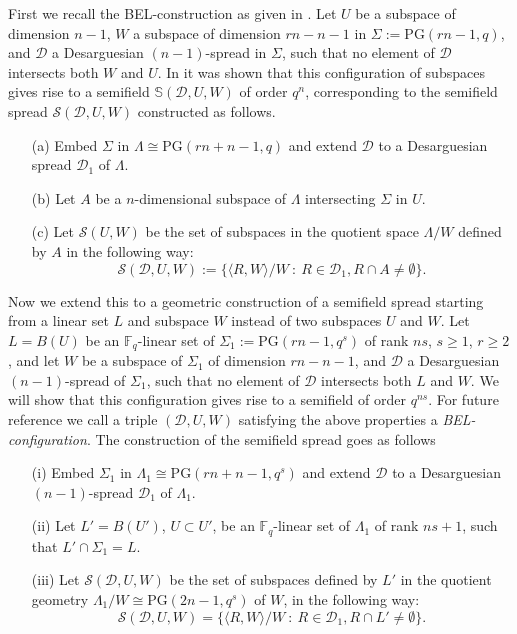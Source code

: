 \documentclass[12pt]{amsart}
\def\F{\mathbb{F}}
\def\PG{\mathrm{PG}}
\def\S{\mathbb{S}}
\def\D{\mathcal{D}}
\begin{document}
First we recall the BEL-construction as given in \cite{BEL}. Let $U$ be a subspace of dimension $n-1$, $W$ a subspace of dimension $rn-n-1$ in $\Sigma:=\PG(rn-1,q)$, and $\D$ a Desarguesian $(n-1)$-spread in $\Sigma$, such that no element of $\D$ intersects both $W$ and $U$. In \cite{BEL} it was shown that this configuration of subspaces gives rise to a semifield $\S(\D,U,W)$ of order $q^n$, corresponding to the semifield spread ${\mathcal{S}}(\D,U,W)$ constructed as follows.
\begin{itemize}
\item[(a)] Embed $\Sigma$ in $\Lambda \cong \PG(rn+n-1,q)$ and extend $\D$ to a Desarguesian spread $\D_1$ of $\Lambda$.
\item[(b)] Let $A$ be a $n$-dimensional subspace of $\Lambda$ intersecting $\Sigma$ in $U$.
\item[(c)] Let ${\mathcal{S}}(U,W)$ be the set of subspaces in the quotient space $\Lambda / W$ defined by $A$ in the following way:
$$
{\mathcal{S}}(\D,U,W):=\{\langle R,W\rangle /W~:~R\in \D_1, R\cap A \neq \emptyset \}.
$$
\end{itemize}



Now we extend this to a geometric construction of a semifield spread starting from a linear set $L$ and subspace $W$ instead of two subspaces $U$ and $W$.
Let $L=B(U)$ be an $\F_q$-linear set of $\Sigma_1:=\PG(rn-1,q^s)$ of rank $ns$, $s\geq 1$, $r\geq 2$, and let $W$ be a subspace of $\Sigma_1$ of dimension $rn-n-1$, and $\D$ a Desarguesian $(n-1)$-spread of $\Sigma_1$, such that no element of $\D$ intersects both $L$ and $W$. We will show that this configuration gives rise to a semifield of order $q^{ns}$. For future reference we call a triple $(\D,U,W)$ satisfying the above properties a {\it BEL-configuration}.
The construction of the semifield spread goes as follows

\begin{itemize}
\item[(i)] Embed $\Sigma_1$ in $\Lambda_1 \cong \PG(rn+n-1,q^s)$ and extend $\D$ to a Desarguesian $(n-1)$-spread $\D_1$ of $\Lambda_1$.
\item[(ii)] Let $L'=B(U')$, $U\subset U'$, be an $\F_q$-linear set of $\Lambda_1$ of rank $ns+1$, such that $L'\cap \Sigma_1 = L$.
\item[(iii)] Let ${\mathcal S}(\D,U,W)$ be the set of subspaces defined by $L'$ in the quotient geometry $\Lambda_1/W \cong \PG(2n-1,q^s)$ of $W$, in the following way:
$$
{\mathcal S}(\D,U,W)=\{\langle R,W\rangle/W ~:~R\in \D_1, R\cap L' \neq \emptyset\}.
$$
\end{itemize}
\end{document}
